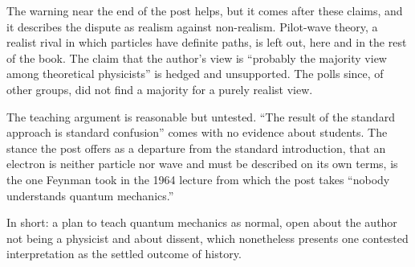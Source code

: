 \begin{afterword}
The warning near the end of the post helps, but it comes after these claims, and it describes the dispute as realism against non-realism. Pilot-wave theory, a realist rival in which particles have definite paths, is left out, here and in the rest of the book. The claim that the author's view is ``probably the majority view among theoretical physicists'' is hedged and unsupported. The polls since, of other groups, did not find a majority for a purely realist view.

The teaching argument is reasonable but untested. ``The result of the standard approach is standard confusion'' comes with no evidence about students. The stance the post offers as a departure from the standard introduction, that an electron is neither particle nor wave and must be described on its own terms, is the one Feynman took in the 1964 lecture from which the post takes ``nobody understands quantum mechanics.''

In short: a plan to teach quantum mechanics as normal, open about the author not being a physicist and about dissent, which nonetheless presents one contested interpretation as the settled outcome of history.
\end{afterword}

